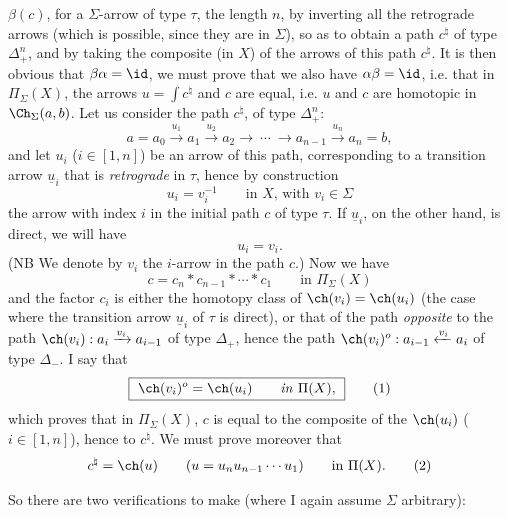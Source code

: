 

$\beta(c)$, for a $\Sigma$-arrow of type $\tau$, the length $n$, by inverting all the retrograde arrows (which is possible, since they are in $\Sigma$), so as to obtain a path $c^\natural$ of type $\Delta_+^n$, and by taking the composite (in $X$) of the arrows of this path $c^\natural$. It is then obvious that $\beta\alpha = \id$, we must prove that we also have $\alpha\beta = \id$, i.e. that in $\Pi_\Sigma(X)$, the arrows $u = \int c^\natural$ and $c$ are equal, i.e. $u$ and $c$ are homotopic in $\Ch_\Sigma(a,b)$. Let us consider the path $c^\natural$, of type $\Delta_+^n$: %
\[
a = a_0 \xrightarrow{u_1} a_1 \xrightarrow{u_2} a_2 \longrightarrow \ \cdots \ \longrightarrow a_{n-1} \xrightarrow{u_n} a_n = b,
\]
and let $u_i$ ($i \in [1,n]$) be an arrow of this path, corresponding to a transition arrow $\underline{u}_i$ that is \textit{retrograde} in $\tau$, hence by construction
\[
u_i = v_i^{-1} \qquad \text{in } X\text{, with } v_i \in \Sigma
\]
the arrow with index $i$ in the initial path $c$ of type $\tau$. If $\underline{u}_i$, on the other hand, is direct, we will have
\[
u_i = v_i.
\]
(NB We denote by $v_i$ the $i$-arrow in the path $c$.) Now we have
\[
c = c_n * c_{n-1} * \cdots * c_1 \qquad \text{in } \Pi_\Sigma(X)
\tag*{$(*)$}
\]
and the factor $c_i$ is either the homotopy class of $\ch(v_i) = \ch(u_i)$ (the case where the transition arrow $\underline{u}_i$ of $\tau$ is direct), or that of the path \textit{opposite} to the path $\ch(v_i) : a_i \xrightarrow{v_i} a_{i-1}$ of type $\Delta_+$, hence the path $\ch(v_i)^o : a_{i-1} \xleftarrow{v_i} a_i$ of type $\Delta_-$. I say that
\[
\boxed{\ \ch(v_i)^o = \ch(u_i) \qquad \text{\textit{in} } \Pi(X),\ }
\tag*{(1)}
\]
which proves that in $\Pi_\Sigma(X)$, $c$ is equal to the composite of the $\ch(u_i)$ ($i \in [1,n]$), hence to $c^\natural$. We must prove moreover that
\[
c^\natural = \ch(u) \qquad (u = u_nu_{n-1}\cdots u_1) \qquad \text{in } \Pi(X).
\tag*{(2)}
\]


So there are two verifications to make (where I again assume $\Sigma$ arbitrary):


